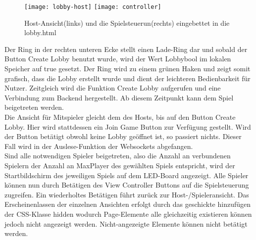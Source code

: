 \documentclass[12pt,a4paper]{article}
\begin{document}
\begin{enumerate}
	\begin{figure}[h]
	\centering
	\texttt{[image: lobby-host]}
	\texttt{[image: controller]}
	\caption{\label{fig:controller}Host-Ansicht(links) und die Spielsteuerun(rechts) eingebettet in die \glqq lobby.html\grqq{}}
	\end{figure}

Der Ring in der rechten unteren Ecke stellt einen Lade-Ring dar und sobald der Button \glqq Create Lobby\grqq{} benutzt wurde, wird der Wert Lobbybool im lokalen Speicher auf \glqq true\grqq{} gesetzt. Der Ring wird zu einem grünen Haken und zeigt somit grafisch, dass die Lobby erstellt wurde und dient der leichteren Bedienbarkeit für Nutzer. Zeitgleich wird die Funktion Create Lobby aufgerufen und eine Verbindung zum Backend hergestellt. Ab diesem Zeitpunkt kann dem Spiel beigetreten werden.
\vspace{1.5ex}\\
Die Ansicht für Mitspieler gleicht dem des Hosts, bis auf den Button \glqq Create Lobby\grqq{}. Hier wird stattdessen ein \glqq Join Game\grqq{} Button zur Verfügung gestellt. Wird der Button betätigt obwohl keine Lobby geöffnet ist, so passiert nichts. Dieser Fall wird in der Auslese-Funktion der Websockets abgefangen. 
\vspace{1.5ex}\\
Sind alle notwendigen Spieler beigetreten, also die Anzahl an verbundenen Spielern der Anzahl an MaxPlayer des gewählten Spiels entspricht, wird der Startbildschirm des jeweiligen Spiels auf dem LED-Board angezeigt. Alle Spieler können nun durch Betätigen des \glqq View Controller\grqq{} Buttons auf die Spielsteuerung zugreifen. Ein wiederholtes Betätigen führt zurück zur Host-/Spieleransicht. Das Erscheinenlassen der einzelnen Ansichten erfolgt durch das geschickte hinzufügen der CSS-Klasse \glqq hidden\grqq{} wodurch Page-Elemente alle gleichzeitig existieren können jedoch nicht angezeigt werden. Nicht-angezeigte Elemente können nicht betätigt werden.  
\end{enumerate}
\end{document}

